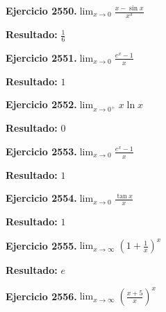 \documentclass[10pt,a4paper]{article}
\begin{document}
\newpage
\begin{ejbox}
\textbf{Ejercicio 2550.}\quad $\lim_{x\to 0} \frac{x-\sin x}{x^3}$
\end{ejbox}

\begin{solbox}
\textbf{Resultado:} \(\displaystyle \frac{1}{6}\)
\end{solbox}

\begin{ejbox}
\textbf{Ejercicio 2551.}\quad $\lim_{x\to 0} \frac{e^x-1}{x}$
\end{ejbox}

\begin{solbox}
\textbf{Resultado:} \(\displaystyle 1\)
\end{solbox}

\begin{ejbox}
\textbf{Ejercicio 2552.}\quad $\lim_{x\to 0^+} x\ln x$
\end{ejbox}

\begin{solbox}
\textbf{Resultado:} \(\displaystyle 0\)
\end{solbox}

\newpage
\begin{ejbox}
\textbf{Ejercicio 2553.}\quad $\lim_{x\to 0} \frac{e^x-1}{x}$
\end{ejbox}

\begin{solbox}
\textbf{Resultado:} \(\displaystyle 1\)
\end{solbox}

\begin{ejbox}
\textbf{Ejercicio 2554.}\quad $\lim_{x\to 0} \frac{\tan x}{x}$
\end{ejbox}

\begin{solbox}
\textbf{Resultado:} \(\displaystyle 1\)
\end{solbox}

\begin{ejbox}
\textbf{Ejercicio 2555.}\quad $\lim_{x\to \infty} \left(1+\frac{1}{x}\right)^x$
\end{ejbox}

\begin{solbox}
\textbf{Resultado:} \(\displaystyle e\)
\end{solbox}

\newpage
\begin{ejbox}
\textbf{Ejercicio 2556.}\quad $\lim_{x\to \infty} \left(\frac{x+5}{x}\right)^{x}$
\end{ejbox}
\end{document}
